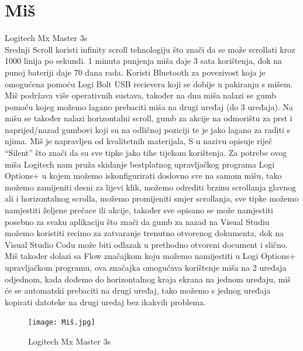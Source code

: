 \documentclass{report}
\begin{document}
\chapter{Miš}
 Logitech Mx Master 3s
\\Srednji Scroll koristi infinity scroll tehnologiju što znači da se može scrollati kroz 1000 linija po sekundi. 1 minuta punjenja miša daje 3 sata korištenja, dok na punoj bateriji daje 70 dana rada. Koristi Bluetooth za povezivost koja je omogućena pomoću Logi Bolt USB recievera koji se dobije u pakiranju s mišem. Miš podržava više operativnih sustava, također na dnu miša nalazi se gumb pomoću kojeg možemo lagano prebaciti miša na drugi uređaj (do 3 uređaja). Na mišu se također nalazi horizontalni scroll, gumb za akcije na odmorištu za prst i naprijed/nazad gumbovi koji su na odličnoj poziciji te je jako lagano za raditi s njima. Miš je napravljen od kvalitetnih materijala, S u nazivu opisuje riječ “Silent” što znači da su sve tipke jako tihe tijekom korištenja. Za potrebe ovog miša Logitech nam pruža skidanje bestplatnog upravljačkog programa Logi Options+ u kojem možemo iskonfigurirati doslovno sve na samom mišu, tako možemo zamijeniti desni za lijevi klik, možemo odrediti brzinu scrollanja glavnog ali i horizontalnog scrolla, možemo promijeniti smjer scrollanja, sve tipke možemo namjestiti željene prečace ili akcije, također sve opisano se može namjestiti posebno za svaku aplikaciju što znači da gumb za nazad na Visual Studiu možemo koristiti recimo za zatvaranje trenutno otvorenog dokumenta, dok na Visual Studio Codu može biti odlazak u prethodno otvoreni document i slično. Miš također dolazi sa Flow značajkom koju možemo namijestiti u Logi Options+ upravljačkom programu, ova značajka omogućava korištenje miša na 2 uređaja odjednom, kada dođemo do horizontalnog kraja ekrana na jednom uređaju, miš će se automatski prebaciti na drugi uređaj, tako možemo s jednog uređaja kopirati datoteke na drugi uređaj bez ikakvih problema.
\begin{figure}[h]
\texttt{[image: Miš.jpg]}
\caption{Logitech Mx Master 3s}
\end{figure}
\end{document}
